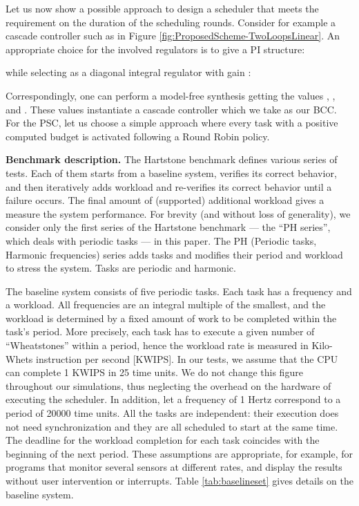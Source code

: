\documentclass[a4paper]{article}
\begin{document}
Let us now show a possible approach to design a scheduler that meets the 
requirement on the duration of the scheduling rounds.
Consider for example a cascade controller such as in Figure 
\ref{fig:ProposedScheme-TwoLoopsLinear}.
An appropriate choice for the involved regulators is to give  a 
PI structure:

while selecting  as a diagonal integral regulator with gain :

Correspondingly, one can perform a model-free synthesis 
getting the values , , and . 
These values instantiate a cascade controller which we take as our BCC.
For the PSC, let us choose a simple approach where every task with a 
positive computed budget is activated following a Round Robin policy.

\textbf{Benchmark description.}
The Hartstone benchmark defines various series of tests.
Each of them starts from a 
baseline system, verifies its correct behavior, and then iteratively adds
workload and re-verifies its correct behavior until a failure occurs.
The final amount of (supported) additional workload gives a measure the system
performance. For brevity (and without loss of generality), we consider 
only the first series of the Hartstone benchmark --- the ``PH series'', 
which deals with periodic tasks --- in this paper.
The PH (Periodic tasks, Harmonic frequencies) series adds 
tasks and modifies their period and workload to stress the system.
Tasks are periodic and harmonic.

The baseline system \cite{Hartstone-1992a} consists
of five periodic tasks. Each task has a frequency and a workload.
All frequencies are an integral multiple of the smallest, and the workload is 
determined by a fixed amount of work to be completed within the task's period.
More precisely, each task has to
execute a given number of ``Wheatstones'' within a period, hence the workload 
rate is measured in Kilo-Whets instruction per second [KWIPS]. In our tests, 
we assume that the CPU can complete 1 KWIPS in 25 time units.
We do not change this figure throughout our simulations, thus neglecting the 
overhead on the hardware of executing the scheduler. In addition, let a 
frequency of 1 Hertz correspond to a period of 20000 time units.
All the tasks are independent: their execution
does not need synchronization and they are all scheduled to start at the same 
time. The deadline for the workload completion for each task coincides with the 
beginning of the next period. These assumptions are appropriate, for example, 
for programs that monitor several sensors at different rates, and display the 
results without user intervention or interrupts.
Table \ref{tab:baselineset} gives details on the baseline system.
\end{document}
